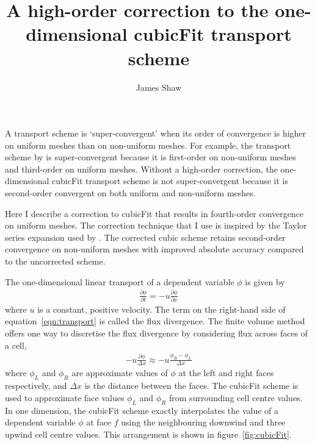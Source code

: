 \documentclass{article}
\title{A high-order correction to the one-dimensional cubicFit transport scheme}
\author{James Shaw}
\begin{document}
\maketitle

A transport scheme is `super-convergent' when its order of convergence is higher on uniform meshes than on non-uniform meshes.
For example, the transport scheme by \citet{skamarock-gassmann2011} is super-convergent because it is first-order on non-uniform meshes and third-order on uniform meshes.
Without a high-order correction, the one-dimensional cubicFit transport scheme is not super-convergent because it is second-order convergent on both uniform and non-uniform meshes.

Here I describe a correction to cubicFit that results in fourth-order convergence on uniform meshes.  The correction technique that I use is inspired by the Taylor series expansion used by \citet{skamarock-gassmann2011}.
The corrected cubic scheme retains second-order convergence on non-uniform meshes with improved absolute accuracy compared to the uncorrected scheme.

The one-dimensional linear transport of a dependent variable $\phi$ is given by
\begin{align}
	\frac{\partial \phi}{\partial t} = - u \frac{\partial \phi}{\partial x} \label{eqn:transport}
\end{align}
where $u$ is a constant, positive velocity.
The term on the right-hand side of equation~\eqref{eqn:transport} is called the flux divergence.
The finite volume method offers one way to discretise the flux divergence by considering flux across faces of a cell,
\begin{align}
	- u \frac{\partial \phi}{\Delta x} \approx - u \frac{\phi_R - \phi_L}{\Delta x} \label{eqn:fluxdiv}
\end{align}
where $\phi_L$ and $\phi_R$ are approximate values of $\phi$ at the left and right faces respectively, and $\Delta x$ is the distance between the faces.  
The cubicFit scheme is used to approximate face values $\phi_L$ and $\phi_R$ from surrounding cell centre values.  In one dimension, the cubicFit scheme exactly interpolates the value of a dependent variable $\phi$ at face $f$ using the neighbouring downwind and three upwind cell centre values.  This arrangement is shown in figure~\ref{fig:cubicFit}.
\end{document}
